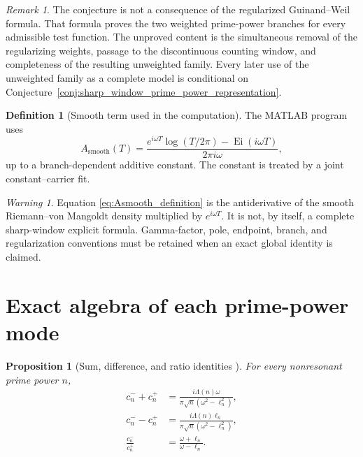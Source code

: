 \documentclass[11pt]{amsart}
\numberwithin{equation}{section}
\theoremstyle{plain}
\newtheorem{proposition}[theorem]{Proposition}
\theoremstyle{definition}
\newtheorem{definition}[theorem]{Definition}
\theoremstyle{remark}
\newtheorem{remark}[theorem]{Remark}
\newtheorem{warning}[theorem]{Warning}
\DeclareMathOperator{\Ei}{Ei}
\newcommand{\1}{\mathbf{1}}
\begin{document}
\begin{remark}
\label{rem:sharp_conjecture_status}
The conjecture is not a consequence of the regularized Guinand--Weil formula.
That formula proves the two weighted prime-power branches for every admissible
test function.  The unproved content is the simultaneous removal of the
regularizing weights, passage to the discontinuous counting window, and
completeness of the resulting unweighted family.  Every later use of the
unweighted family as a complete model is conditional on
Conjecture~\ref{conj:sharp_window_prime_power_representation}.
\end{remark}

\begin{definition}[Smooth term used in the computation]
\label{def:Asmooth}
The MATLAB program uses
\begin{equation}
A_{\mathrm{smooth}}(T)
=
\frac{
e^{i\omega T}\log(T/2\pi)-\Ei(i\omega T)
}{
2\pi i\omega
},
\label{eq:Asmooth_definition}
\end{equation}
up to a branch-dependent additive constant.  The constant is treated by
a joint constant--carrier fit.
\end{definition}

\begin{warning}
\label{warn:Asmooth_status}
Equation \eqref{eq:Asmooth_definition} is the antiderivative of the
smooth Riemann--von Mangoldt density multiplied by \(e^{i\omega T}\).
It is not, by itself, a complete sharp-window explicit formula.
Gamma-factor, pole, endpoint, branch, and regularization conventions must
be retained when an exact global identity is claimed.
\end{warning}

\section{Exact algebra of each prime-power mode}
\label{sec:mode_algebra}


\begin{proposition}[Sum, difference, and ratio identities {}]
\label{prop:coefficient_identities}
For every nonresonant prime power \(n\),
\begin{align}
c_n^-+c_n^+
&=
\frac{i\Lambda(n)\omega}
{\pi\sqrt n(\omega^2-\ell_n^2)},
\label{eq:coefficient_sum}
\\
c_n^--c_n^+
&=
\frac{i\Lambda(n)\ell_n}
{\pi\sqrt n(\omega^2-\ell_n^2)},
\label{eq:coefficient_difference}
\\
\frac{c_n^-}{c_n^+}
&=
\frac{\omega+\ell_n}{\omega-\ell_n}.
\label{eq:coefficient_ratio}
\end{align}
\end{proposition}
\end{document}
